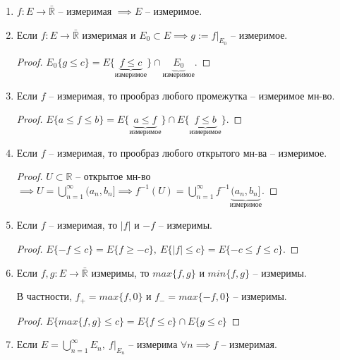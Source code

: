 \begin{properties}
    \begin{enumerate}
        \item {
            $f: E \rightarrow \bar{\mathbb{R}}$ -- измеримая $\implies E$ -- измеримое.
        }
        \item {
            Если $f: E \rightarrow \bar{\mathbb{R}}$ измеримая и $E_0 \subset E \implies g := f |_{E_0}$ -- измеримое.

            \begin{proof}
                $E_0\{ g \leq c \} = E \{ \underbrace{f \leq c}_{\text{измеримое}} \} \cap \underbrace{E_0}_{\text{измеримое}}$.
            \end{proof}
        }
        \item {
            Если $f$ -- измеримая, то прообраз любого промежутка -- измеримое мн-во.

            \begin{proof}
                $E\{ a \leq f \leq b \} = E\{ \underbrace{a \leq f}_{\text{измеримое}} \} \cap E\{\underbrace{f \leq b}_{\text{измеримое}}\}$.
            \end{proof}
        }
        \item {
            Если $f$ -- измеримая, то прообраз любого открытого мн-ва -- измеримое.

            \begin{proof}
                $U \subset \mathbb{R}$ -- открытое мн-во $\implies U = \bigcup_{n=1}^{\infty} (a_n, b_n] \implies f^{-1}(U) = \bigcup_{n=1}^{\infty} f^{-1}\underbrace{(a_n, b_n]}_{\text{измеримое}}$.
            \end{proof}
        }
        \item {
            Если $f$ -- измеримая, то $|f|$ и $-f$ -- измеримы.

            \begin{proof}
                $E \{ -f \leq c \} = E \{ f \geq -c \}, \ E \{ |f| \leq c \} = E \{ -c \leq f \leq c \}$.
            \end{proof}
        }
        \item {
            Если $f, g: E \rightarrow \bar{\mathbb{R}}$ измеримы, то $max\{ f, g \}$ и $min \{ f, g \}$ -- измеримы.

            В частности, $f_+ = max\{ f, 0 \} $ и $f_- = max\{ -f, 0 \}$ -- измеримы.

            \begin{proof}
                $E \{ max \{ f, g \} \leq c \} = E \{ f \leq c \} \cap E \{ g \leq c \}$
            \end{proof}
        }
        \item {
            Если $E = \bigcup_{n=1}^{\infty}E_n, \ f|_{E_n}$ -- измерима $\forall n \implies f$ -- измеримая.

}
\end{enumerate}
\end{properties}
